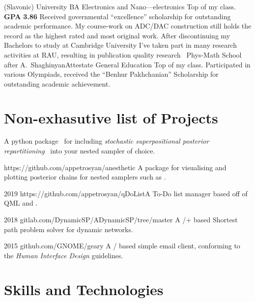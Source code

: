 \documentclass{CurriculumVitae}[10pt, draft, condensed]
\begin{document}
{{     (Slavonic) University} {BA }{Electronics and
     Nano---electronics} {Top of my class. \textbf{GPA} \textbf{3.86}
     Received governmental ``excellence'' scholarship for outstanding
     academic performance. My course-work on ADC/DAC construction
     still holds the record as the highest rated and most original
     work. After discontinuing my Bachelors to study at Cambridge
     University I've taken part in many research activities at RAU,
     resulting in publication quality
     research~\cite{cu2o,measurement}} 
   {Phys-Math School after A.~Shaghinyan}{Attestate }{General
     Education} {Top of my class. Participated in various Olympiads,
     received the ``Benhur Pakhchanian'' Scholarship for outstanding
     academic achievement. }

\section*{Non-exhasutive list of Projects}%
%


 {A
  python package~\cite{sspr-joss} for including \emph{stochastic
    superpositional posterior repartitioning}~\cite{sspr} into your
  nested sampler of choice.}

 {https://github.com/appetrosyan/anesthetic}
{A package for visualising and plotting posterior chains for nested
  samplers such as .}

 {2019} {https://github.com/appetrosyan/qDoList}{A
  To-Do list manager based off of QML and .}

 {2018}
{gitlab.com/DynamicSP/ADynamicSP/tree/master} {A
  /+ based Shortest path problem solver for
  dynamic networks. }

 {2015} {github.com/GNOME/geary} {A
  / based simple email client, conforming to the
   \emph{Human Interface Design} guidelines.}

}

\section*{Skills and Technologies}
\end{document}
